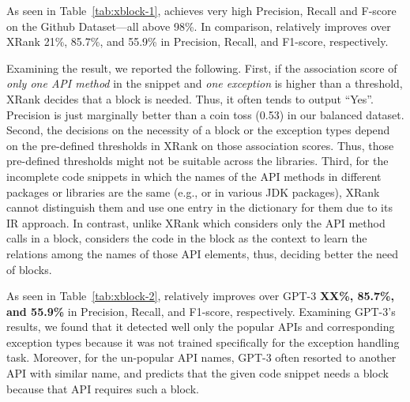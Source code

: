 
As seen in Table~\ref{tab:xblock-1}, {\tool} achieves very high
Precision, Recall and F-score on the Github Dataset---all above
98\%.
In comparison, {\tool} relatively improves over XRank 21\%, 85.7\%,
and 55.9\% in Precision, Recall, and F1-score, respectively.

Examining the result, we reported the following. First, if the
association score of {\em only one API method} in the snippet and {\em one
exception} is higher than a threshold, XRank decides that a
 block is needed.  Thus, it often tends to output
  ``Yes''. Precision is just marginally better than a coin toss
(0.53) in our balanced dataset.
Second,
the decisions on the necessity of a  block or the
exception types depend on the pre-defined thresholds in XRank on those
association scores. Thus, those pre-defined thresholds might not be
suitable across the libraries. Third, for the incomplete code snippets
in which the names of the API methods in different packages or
libraries are the same (e.g.,  or  in
various JDK packages), XRank cannot distinguish them and use one entry
in the dictionary for them due to its IR approach. In contrast, unlike
XRank which considers only the API method calls in a 
block, {\tool} considers the code in the block as the context to learn
the relations among the names of those API elements,
thus, deciding better the need of  blocks.


As seen in Table~\ref{tab:xblock-2}, {\tool} relatively improves over
GPT-3 {\bf XX\%, 85.7\%, and 55.9\%} in Precision, Recall, and
F1-score, respectively. Examining GPT-3's results, we found that it
detected well only the popular APIs and corresponding exception types
because it was not trained specifically for the exception handling
task. Moreover, for the un-popular API names, GPT-3 often
resorted to another API with similar name, and predicts that the given
code snippet needs a  block because that API requires
such a block.


